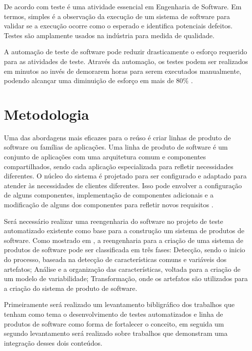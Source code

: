 \documentclass[12pt,a4paper]{article}
\begin{document}
De acordo com \cite{bertolino2007} teste é uma atividade essencial em Engenharia de Software. Em termos, simples é a observação da execução de um sistema de software para validar se a execução ocorre como o esperado e identifica potenciais defeitos. Testes são amplamente usados na indústria para medida de qualidade.

A automação de teste de software pode reduzir drasticamente o esforço requerido para as atividades de teste. Através da automação, os testes podem ser realizados em minutos ao invés de demorarem horas para serem executados manualmente, podendo alcançar uma diminuição de esforço em mais de 80\%  \cite{fewster1999}.
\section{Metodologia}
Uma das abordagens mais eficazes para o reúso é criar linhas de produto de software ou famílias de aplicações. Uma linha de produto de software é um conjunto de aplicações com uma arquitetura comum e componentes compartilhados, sendo cada aplicação especializada para refletir necessidades diferentes. O núcleo do sistema é projetado para ser configurado e adaptado para atender às necessidades de clientes diferentes. Isso pode envolver a configuração de alguns componentes, implementação de componentes adicionais e a modificação de alguns dos componentes para refletir novos requisitos \cite{Sommerville2011}.

Será necessário realizar uma reengenharia do software no projeto de teste automatizado existente como base para a construção um sistema de produtos de software. Como mostrado em \cite{assunccao2017}, a reengenharia para a criação de uma sistema de produtos de software pode ser classificada em três fases: Detecção, sendo o inicio do processo, baseada na detecção de características comuns e variáveis dos artefatos; Análise e a organização das características, voltada para a criação de um modelo de variabilidade; Transformação, onde os artefatos são utilizados para a criação do sistema de produto de software.

Primeiramente será realizado um levantamento bibligráfico dos trabalhos que tenham como tema o desenvolvimento de testes automatizados e linha de produtos de software como forma de fortalecer o conceito, em seguida um segundo levantamento será realizado sobre trabalhos que demonstram uma integração desses dois conteúdos.
\end{document}
